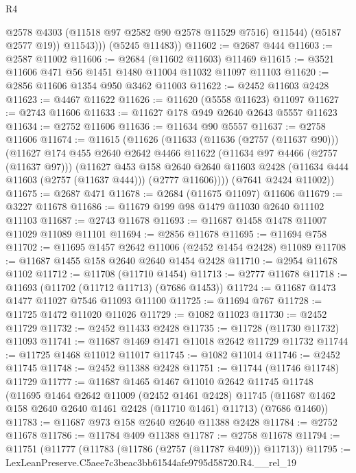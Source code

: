 \begin{lexlean}{R4}
\begin{coremodule}
                @2578
                @4303
                (@11518 @97 @2582 @90 @2578 @11529 @7516)
                @11544)
              (@5187 @2577 @19))
            @11543)))
      (@5245 @11483))
@11602 := @2687 @444
@11603 := @2587 @11002
@11606 := @2684 (@11602 @11603) @11469
@11615 := @3521 @11606 @471 @56 @1451 @1480 @11004 @11032 @11097 @11103
@11620 := @2856 @11606 @1354 @950 @3462 @11003
@11622 := @2452 @11603 @2428
@11623 := @4467 @11622
@11626 := @11620 (@5558 @11623) @11097
@11627 := @2743 @11606
@11633 := @11627 @178 @949 @2640 @2643 @5557 @11623
@11634 := @2752 @11606
@11636 := @11634 @90 @5557
@11637 := @2758 @11606
@11674 := @11615
    (@11626
      (@11633
        (@11636 (@2757 (@11637 @90)))
        (@11627
          @174
          @455
          @2640
          @2642
          @4466
          @11622
          (@11634 @97 @4466 (@2757 (@11637 @97)))
          (@11627
            @453
            @158
            @2640
            @2640
            @11603
            @2428
            (@11634 @444 @11603 (@2757 (@11637 @444)))
            (@2777 @11606))))
      (@7641 @2424 @11002))
@11675 := @2687 @471
@11678 := @2684 (@11675 @11097) @11606
@11679 := @3227 @11678
@11686 := @11679 @199 @98 @1479 @11030 @2640 @11102 @11103
@11687 := @2743 @11678
@11693 := @11687 @1458 @1478 @11007 @11029 @11089 @11101
@11694 := @2856 @11678
@11695 := @11694 @758
@11702 := @11695 @1457 @2642 @11006 (@2452 @1454 @2428) @11089
@11708 := @11687 @1455 @158 @2640 @2640 @1454 @2428
@11710 := @2954 @11678 @1102
@11712 := @11708 (@11710 @1454)
@11713 := @2777 @11678
@11718 := @11693 (@11702 (@11712 @11713) (@7686 @1453))
@11724 := @11687 @1473 @1477 @11027 @7546 @11093 @11100
@11725 := @11694 @767
@11728 := @11725 @1472 @11020 @11026
@11729 := @1082 @11023
@11730 := @2452 @11729
@11732 := @2452 @11433 @2428
@11735 := @11728 (@11730 @11732) @11093
@11741 := @11687 @1469 @1471 @11018 @2642 @11729 @11732
@11744 := @11725 @1468 @11012 @11017
@11745 := @1082 @11014
@11746 := @2452 @11745
@11748 := @2452 @11388 @2428
@11751 := @11744 (@11746 @11748) @11729
@11777 := @11687
    @1465
    @1467
    @11010
    @2642
    @11745
    @11748
    (@11695
      @1464
      @2642
      @11009
      (@2452 @1461 @2428)
      @11745
      (@11687 @1462 @158 @2640 @2640 @1461 @2428 (@11710 @1461) @11713)
      (@7686 @1460))
@11783 := @11687 @973 @158 @2640 @2640 @11388 @2428
@11784 := @2752 @11678
@11786 := @11784 @409 @11388
@11787 := @2758 @11678
@11794 := @11751 (@11777 (@11783 (@11786 (@2757 (@11787 @409))) @11713))
@11795 := LexLeanPreserve.C5aee7c3beac3bb61544afe9795d58720.R4.__rel_19

\end{coremodule}
\end{lexlean}
